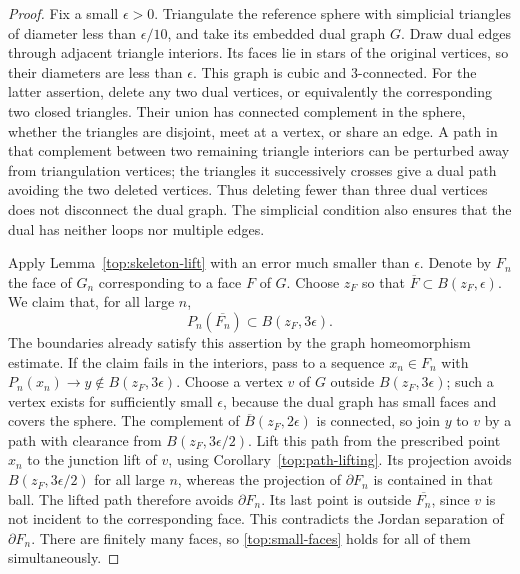 \documentclass[11pt]{article}
\numberwithin{equation}{section}
\theoremstyle{definition}
\theoremstyle{remark}
\newcommand{\1}{\mathbf 1}
\begin{document}
\begin{proof}
Fix a small $\epsilon>0$.  Triangulate the reference sphere with
simplicial triangles of diameter less than $\epsilon/10$, and take
its embedded dual graph $G$.  Draw dual edges through adjacent
triangle interiors.  Its faces lie in stars of the original vertices,
so their diameters are less than $\epsilon$.
This graph is cubic and $3$-connected.  For the latter assertion,
delete any two dual vertices, or equivalently the corresponding
two closed triangles.  Their union has connected complement in
the sphere, whether the triangles are disjoint, meet at a vertex,
or share an edge.  A path in that complement between two remaining
triangle interiors can be perturbed away from triangulation
vertices; the triangles it successively crosses give a dual path
avoiding the two deleted vertices.  Thus deleting fewer than three
dual vertices does not disconnect the dual graph.  The simplicial
condition also ensures that the dual has neither loops nor multiple
edges.

Apply Lemma~\ref{top:skeleton-lift} with an error much smaller than
$\epsilon$.  Denote by $F_n$ the face of $G_n$ corresponding to a
face $F$ of $G$.  Choose $z_F$ so that
$\overline F\subset B(z_F,\epsilon)$.  We claim that, for all
large $n$,
\begin{equation}\label{top:small-faces}
 P_n(\overline{F_n})\subset B(z_F,3\epsilon).
\end{equation}
The boundaries already satisfy this assertion by the graph
homeomorphism estimate.  If the claim fails in the interiors,
pass to a sequence $x_n\in F_n$ with
$P_n(x_n)\to y\notin B(z_F,3\epsilon)$.  Choose a vertex $v$ of
$G$ outside $B(z_F,3\epsilon)$; such a vertex exists for sufficiently
small $\epsilon$, because the dual graph has small faces and covers
the sphere.  The complement of
$\overline B(z_F,2\epsilon)$ is connected, so join $y$ to $v$ by
a path with clearance from $B(z_F,3\epsilon/2)$.  Lift this path
from the prescribed point $x_n$ to the junction lift of $v$, using
Corollary~\ref{top:path-lifting}.  Its projection avoids
$B(z_F,3\epsilon/2)$ for all large $n$, whereas the projection of
$\partial F_n$ is contained in that ball.  The lifted path
therefore avoids $\partial F_n$.  Its last point is outside
$\overline{F_n}$, since $v$ is not incident to the corresponding
face.  This contradicts the Jordan separation of $\partial F_n$.
There are finitely many faces, so \eqref{top:small-faces} holds
for all of them simultaneously.


\end{proof}
\end{document}
